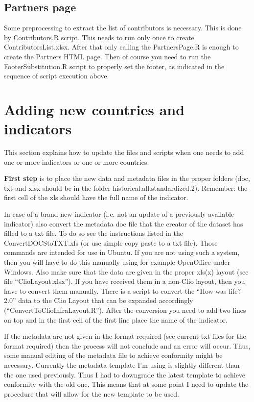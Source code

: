 \documentclass[a4paper]{article}
\begin{document}
\subsection{Partners page}

Some preprocessing to extract the list of contributors is necessary. This is 
done by Contributors.R script. This needs to run only once to create 
ContributorsList.xlsx. After that only calling the PartnersPage.R is enough to 
create the Partners HTML page. Then of course you need to run the 
FooterSubstitution.R script to properly set the footer, as indicated in the 
sequence of script execution above.

\section{Adding new countries and indicators}

This section explains how to update the files and scripts when one needs to add 
one or more indicators or one or more countries.

\textbf{First step} is to place the new data and metadata files in the proper folders (doc, txt and xlsx should be in the folder historical.all.standardized.2). Remember: the first cell of the xls should have the full name of the indicator.

In case of a brand new indicator (i.e. not an update of a previously available indicator) also convert the metadata doc file that the creator of the dataset has filled to a txt file. To do so see the instructions listed in the ConvertDOCStoTXT.xls (or use simple copy paste to a txt file). Those commands are intended for use in Ubuntu. If you are not using such a system, then you will have to do this manually using for example OpenOffice under Windows. Also make sure that the data are given in the proper xls(x) layout (see file ``ClioLayout.xlsx''). If you have received them in a non-Clio layout, then you have to convert them manually. There is a script to convert the ``How was life? 2.0'' data to the Clio Layout that can be expanded accordingly (``ConvertToClioInfraLayout.R''). After the conversion you need to add two lines on top and in the first cell of the first line place the name of the indicator.

If the metadata are not given in the format required (see current txt files for 
the format required) then the process will not conclude and an error will 
occur. Thus, some manual editing of the metadata file to achieve conformity 
might be necessary. Currently the metadata template I'm using is slightly 
different than the one used previously. Thus I had to downgrade the latest 
template to achieve conformity with the old one. This means that at some point 
I need to update the procedure that will allow for the new template to be used.
\end{document}
